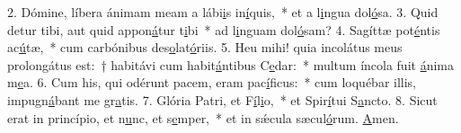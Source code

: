2. Dómine, líbera ánimam meam a lábi\uline{i}s in\uline{í}quis,~* et a l\uline{i}ngua dol\uline{ó}sa.
3. Quid detur tibi, aut quid appon\uline{á}tur t\uline{i}bi~* ad l\uline{i}nguam dol\uline{ó}sam?
4. Sagíttæ pot\uline{é}ntis ac\uline{ú}tæ,~* cum carbónibus des\uline{o}lat\uline{ó}riis.
5. Heu mihi! quia incolátus meus prolongátus est:~† habitávi cum habit\uline{á}ntibus C\uline{e}dar:~* multum íncola fuit \uline{á}nima m\uline{e}a.
6. Cum his, qui odérunt pacem, eram pac\uline{í}f\uline{i}cus:~* cum loquébar illis, impugn\uline{á}bant me gr\uline{a}tis.
7. Glória Patri, et F\uline{í}l\uline{i}o,~* et Spir\uline{í}tui S\uline{a}ncto.
8. Sicut erat in princípio, et n\uline{u}nc, et s\uline{e}mper,~* et in sǽcula sæcul\uline{ó}rum. \uline{A}men.
